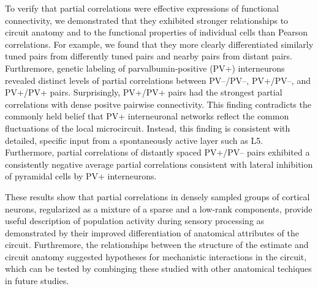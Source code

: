 To verify that partial correlations were effective expressions of functional connectivity, we demonstrated that they exhibited stronger relationships to circuit anatomy and to the functional properties of individual cells than Pearson correlations. 
For example, we found that they more clearly differentiated similarly tuned pairs from differently tuned pairs and nearby pairs from distant pairs.  
Furthremore, genetic labeling of parvalbumin-positive (PV+) interneurons revealed distinct levels of  partial correlations between PV--/PV--, PV+/PV--, and PV+/PV+ pairs. 
Surprisingly, PV+/PV+ pairs had the strongest partial correlations with dense positve pairwise connectivity. 
This finding contradicts the commonly held belief that PV+ interneuronal networks reflect  the common fluctuations of the local microcircuit. Instead, this finding is consistent with detailed, specific input from a spontaneously active layer such as L5.
Furthermore, partial correlations of distantly spaced PV+/PV-- pairs exhibited a consistently negative average partial correlations consistent with lateral inhibition of pyramidal cells by PV+ interneurons. 

These results show that partial correlations in densely sampled groups of cortical neurons, regularized as a mixture of a sparse and a low-rank components, provide useful description of population activity during sensory processing as demonstrated by their improved differentiation of anatomical attributes of the circuit.  Furthremore, the relationships between the structure of the estimate and circuit anatomy suggested hypotheses for mechanistic interactions in the circuit, which can be tested by combinging these studied with other anatomical techiques in future studies.
